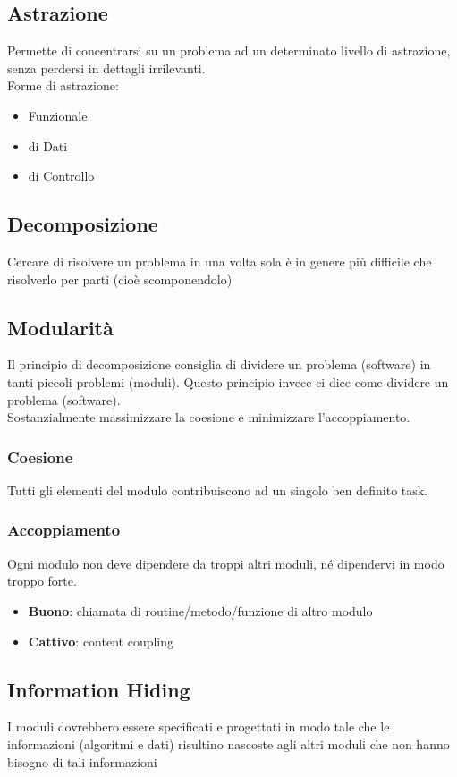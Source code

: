 \subsection{Astrazione}
Permette di concentrarsi su un problema ad un determinato livello di astrazione, senza perdersi in dettagli irrilevanti.\\
Forme di astrazione:
\begin{itemize}
    \item Funzionale
    \item di Dati
    \item di Controllo
\end{itemize}

\subsection{Decomposizione}
Cercare di risolvere un problema in una volta sola è in genere più difficile che risolverlo per parti (cioè scomponendolo)

\subsection{Modularità}
Il principio di decomposizione consiglia di dividere un problema (software) in tanti piccoli problemi (moduli). Questo principio invece ci dice come dividere un problema (software).\\
Sostanzialmente massimizzare la coesione e minimizzare l’accoppiamento.

\subsubsection{Coesione}
Tutti gli elementi del modulo contribuiscono ad un singolo ben definito task.

\subsubsection{Accoppiamento}
Ogni modulo non deve dipendere da troppi altri moduli, né dipendervi in modo troppo forte.
\begin{itemize}
    \item \textbf{Buono}: chiamata di routine/metodo/funzione di altro modulo
    \item \textbf{Cattivo}: content coupling
\end{itemize}

\subsection{Information Hiding}
I moduli dovrebbero essere specificati e progettati in modo tale che le informazioni (algoritmi e dati) risultino nascoste agli altri moduli che non hanno bisogno di tali informazioni

